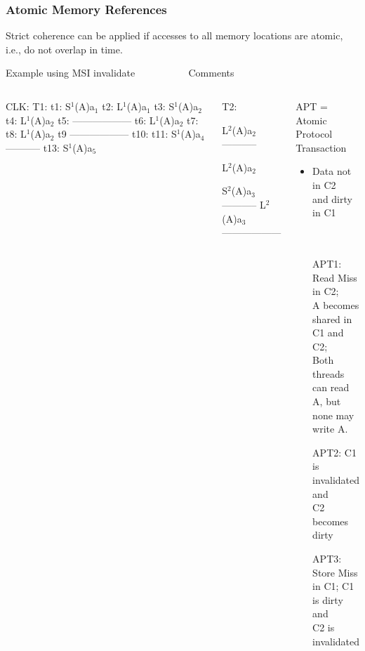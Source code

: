 \documentclass{beamer}
\newcommand{\emp}[1]{\textcolor{DikuRed}{ #1}}
\newcommand{\mymath}[1]{$ #1 $}
\newcommand{\myindx}[1]{_{#1}}
\newcommand{\myindu}[1]{^{#1}}
\begin{document}
\begin{frame}[fragile,t]
\frametitle{Atomic Memory References}

Strict coherence can be applied if accesses to all memory locations are atomic,
i.e., do not overlap in time.

\begin{block}{Example using MSI invalidate{\tt~~~~~~~~~~} Comments}
\begin{columns}
\begin{colorcode}[fontsize=\scriptsize]
CLK: T1:
t1:  S\mymath{\myindu{1}}(A)a\mymath{\myindx{1}}
t2:  L\mymath{\myindu{1}}(A)a\mymath{\myindx{1}}
t3:  S\mymath{\myindu{1}}(A)a\mymath{\myindx{2}}
t4:  L\mymath{\myindu{1}}(A)a\mymath{\myindx{2}}
t5:  ------------------
t6:  L\mymath{\myindu{1}}(A)a\mymath{\myindx{2}}
t7:  
t8:  L\mymath{\myindu{1}}(A)a\mymath{\myindx{2}}
t9   ------------------
t10: 
t11: S\mymath{\myindu{1}}(A)a\mymath{\myindx{4}}-----------
t13: S\mymath{\myindu{1}}(A)a\mymath{\myindx{5}}
\end{colorcode} 
\begin{colorcode}[fontsize=\scriptsize]
T2:




L\mymath{\myindu{2}}(A)a\mymath{\myindx{2}}-----------

L\mymath{\myindu{2}}(A)a\mymath{\myindx{2}}

S\mymath{\myindu{2}}(A)a\mymath{\myindx{3}}-----------
L\mymath{\myindu{2}}(A)a\mymath{\myindx{3}}
------------------

\end{colorcode} 
\pause
\begin{scriptsize}
\emp{APT} = Atomic Protocol Transaction\\
\begin{itemize}
    \item Data not in C2\\
            and dirty in C1\\
            {\tt~~}\\
            {\tt~~}\\

    \item[\emp{APT1}:] Read Miss in C2;\\
                        A becomes shared in C1 and C2;\\
                        Both threads can read A, but\\
                        none may write A.
    \item[\emp{APT2}:] C1 is invalidated and\\ 
                      C2 becomes dirty
    \item[\emp{APT3:}] Store Miss in C1; C1 is dirty and\\
                        C2 is invalidated
\end{itemize}
\end{scriptsize}
\end{columns}
\end{block}

\end{frame}
\end{document}
